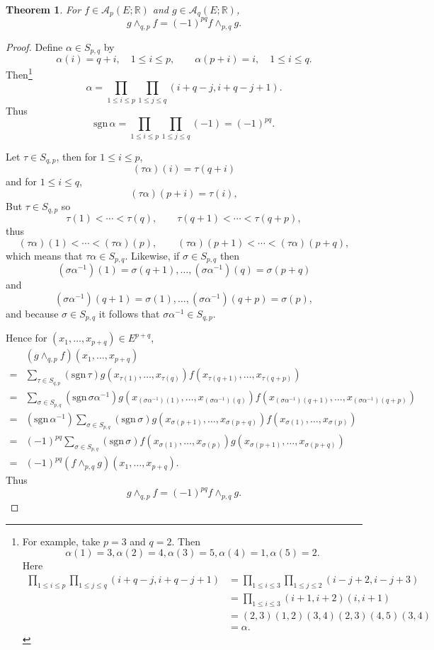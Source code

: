 \documentclass{article}
\newcommand{\sgn}{\mathrm{sgn}\,}
\newtheorem{theorem}{Theorem}
\theoremstyle{definition}
\begin{document}
\begin{theorem}
For $f \in \mathscr{A}_p(E;\mathbb{R})$ and  $g \in \mathscr{A}_q(E;\mathbb{R})$,
\[
g \wedge_{q,p} f = (-1)^{pq} f \wedge_{p,q} g.
\]
\label{swap}
\end{theorem}
\begin{proof}
Define $\alpha \in S_{p,q}$ by
\[
\alpha(i) = q+i,\quad 1 \leq i \leq p,\qquad \alpha(p+i) = i,\quad 1 \leq i \leq q.
\]
Then\footnote{For example, take $p=3$ and $q=2$. Then
\[
\alpha(1) = 3, \alpha(2) = 4, \alpha(3) = 5, \alpha(4) = 1, \alpha(5)=2.
\]
Here
\begin{align*}
\prod_{1 \leq i \leq p} \prod_{1 \leq j \leq q} (i+q-j,i+q-j+1)&=
\prod_{1 \leq i \leq 3} \prod_{1 \leq j \leq 2} (i-j+2,i-j+3)\\
&=\prod_{1 \leq i \leq 3} (i+1,i+2)(i,i+1)\\
&=(2,3)(1,2)(3,4)(2,3)(4,5)(3,4)\\
&=\alpha.
\end{align*}
}
\[
\alpha=\prod_{1 \leq i \leq p} \prod_{1 \leq j \leq q} (i+q-j,i+q-j+1).
\]
Thus
\[
\sgn \alpha = \prod_{1 \leq i \leq p} \prod_{1 \leq j \leq q} (-1)
=(-1)^{pq}.
\]


Let  $\tau \in S_{q,p}$, then 
for $1 \leq i \leq p$,
\[
(\tau \alpha)(i) = \tau(q+i)
\]
and
for $1 \leq i \leq q$,
\[
(\tau \alpha)(p+i) = \tau(i),
\]
But $\tau \in S_{q,p}$ so
\[
\tau(1)<\cdots<\tau(q),\qquad \tau(q+1)<\cdots<\tau(q+p),
\]
thus
\[
(\tau \alpha)(1)<\cdots<(\tau \alpha)(p),
\qquad (\tau \alpha)(p+1)<\cdots<(\tau\alpha)(p+q),
\]
which means that $\tau \alpha \in S_{p,q}$. 
Likewise, if $\sigma \in S_{p,q}$ then
\[
(\sigma \alpha^{-1})(1) = \sigma(q+1),
\ldots, (\sigma \alpha^{-1})(q) = \sigma(p+q)
\]
and
\[
(\sigma \alpha^{-1})(q+1)=\sigma(1),
\ldots, (\sigma \alpha^{-1})(q+p)=\sigma(p),
\]
and because $\sigma \in S_{p,q}$ it follows that
$\sigma \alpha^{-1} \in S_{q,p}$. 


Hence for
$(x_1,\ldots,x_{p+q}) \in E^{p+q}$,
\[
\begin{split}
&(g \wedge_{q,p} f)(x_1,\ldots,x_{p+q})\\
=&\sum_{\tau \in S_{q,p}} (\sgn \tau) g(x_{\tau(1)},\ldots,x_{\tau(q)}) f(x_{\tau(q+1)},\ldots,x_{\tau(q+p)})\\
=&\sum_{\sigma \in S_{p,q}} (\sgn \sigma \alpha^{-1}) g(x_{(\sigma \alpha^{-1})(1)},\ldots,
x_{(\sigma \alpha^{-1})(q)})
f(x_{(\sigma \alpha^{-1})(q+1)},\ldots,
x_{(\sigma \alpha^{-1})(q+p)})\\
=&(\sgn \alpha^{-1}) \sum_{\sigma \in S_{p,q}} (\sgn \sigma) g(x_{\sigma(p+1)},\ldots,x_{\sigma(p+q)})
f(x_{\sigma(1)},\ldots,x_{\sigma(p)})\\
=&(-1)^{pq} \sum_{\sigma \in S_{p,q}} (\sgn \sigma) f(x_{\sigma(1)},\ldots,x_{\sigma(p)}) g(x_{\sigma(p+1)},\ldots,x_{\sigma(p+q)})\\
=&(-1)^{pq} (f \wedge_{p,q} g)(x_1,\ldots,x_{p+q}).
\end{split}
\]
Thus
\[
g \wedge_{q,p} f = (-1)^{pq} f \wedge_{p,q} g. 
\]
\end{proof}
\end{document}
